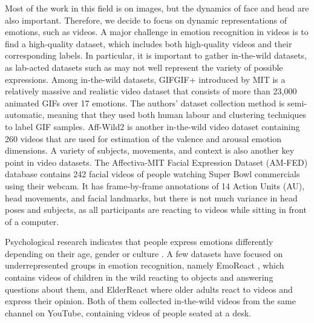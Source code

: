 \documentclass[letterpaper, 10 pt, conference]{ieeeconf}  \usepackage{FG2021}
\begin{document}
Most of the work in this field is on images, but the dynamics of face and head are also important. Therefore, we decide to focus on dynamic representations of emotions, such as videos. A major challenge in emotion recognition in videos is to find a high-quality dataset, which includes both high-quality videos and their corresponding labels. In particular, it is important to gather in-the-wild datasets, as lab-acted datasets such as  \cite{amsterdam-dataset} may not well represent the variety of possible expressions. Among in-the-wild datasets, GIFGIF+ \cite{gifgif} introduced by MIT is a relatively massive and realistic video dataset that consists of more than 23,000 animated GIFs over 17 emotions. The authors' dataset collection method is semi-automatic, meaning that they used both human labour and clustering techniques to label GIF samples. Aff-Wild2 \cite{kollias2018affwild2} is another in-the-wild video dataset containing 260 videos that are used for estimation of the valence and arousal emotion dimensions. A variety of subjects, movements, and context is also another key point in video datasets. The Affectiva-MIT Facial Expression Dataset (AM-FED) database \cite{AM-FED} contains 242 facial videos of people watching Super Bowl commercials using their webcam. It has frame-by-frame annotations of 14 Action Units (AU), head movements, and facial landmarks, but there is not much variance in head poses and subjects, as all participants are reacting to videos while sitting in front of a computer. 

Psychological research indicates that people express emotions differently depending on their age, gender or culture \cite{cite31}. A few datasets have focused on underrepresented groups in emotion recognition, namely EmoReact \cite{emoreact}, which contains videos of children in the wild reacting to objects and answering questions about them, and ElderReact  \cite{elderreact} where older adults react to videos and express their opinion. Both of them collected in-the-wild videos from the same channel on YouTube, containing videos of people seated at a desk.
\end{document}

